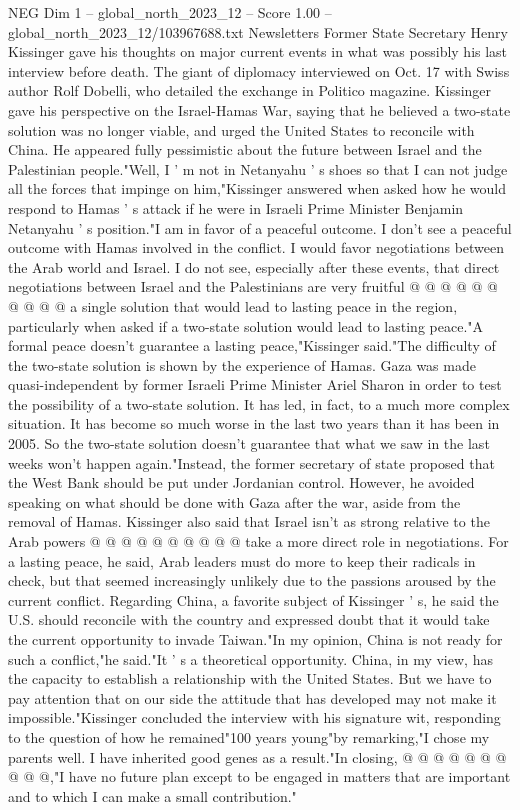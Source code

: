 \begin{textsample}{NEG Dim 1 – global\_north\_2023\_12 – Score 1.00 – global\_north\_2023\_12/103967688.txt}  \label{ex:f1_neg_364}
Newsletters Former State Secretary Henry Kissinger gave his thoughts on major current events in what was possibly his last interview before death.
The giant of diplomacy interviewed on Oct. 17 with Swiss author Rolf Dobelli, who detailed the exchange in Politico magazine.
Kissinger gave his perspective on the Israel-Hamas War, saying that he believed a two-state solution was no longer viable, and urged the United States to reconcile with China.
He appeared fully pessimistic about the future between Israel and the Palestinian people."Well, I ' m not in Netanyahu ' s shoes so that I can not judge all the forces that impinge on him,"Kissinger answered when asked how he would respond to Hamas ' s attack if he were in Israeli Prime Minister Benjamin Netanyahu ' s position."I am in favor of a peaceful outcome.
I don't see a peaceful outcome with Hamas involved in the conflict.
I would favor negotiations between the Arab world and Israel.
I do not see, especially after these events, that direct negotiations between Israel and the Palestinians are very fruitful @ @ @ @ @ @ @ @ @ @ a single solution that would lead to lasting peace in the region, particularly when asked if a two-state solution would lead to lasting peace."A formal peace doesn't guarantee a lasting peace,"Kissinger said."The difficulty of the two-state solution is shown by the experience of Hamas.
Gaza was made quasi-independent by former Israeli Prime Minister Ariel Sharon in order to test the possibility of a two-state solution.
It has led, in fact, to a much more complex situation.
It has become so much worse in the last two years than it has been in 2005.
So the two-state solution doesn't guarantee that what we saw in the last weeks won't happen again."Instead, the former secretary of state proposed that the West Bank should be put under Jordanian control.
However, he avoided speaking on what should be done with Gaza after the war, aside from the removal of Hamas.
Kissinger also said that Israel isn't as strong relative to the Arab powers @ @ @ @ @ @ @ @ @ @ take a more direct role in negotiations.
For a lasting peace, he said, Arab leaders must do more to keep their radicals in check, but that seemed increasingly unlikely due to the passions aroused by the current conflict.
Regarding China, a favorite subject of Kissinger ' s, he said the U.S. should reconcile with the country and expressed doubt that it would take the current opportunity to invade Taiwan."In my opinion, China is not ready for such a conflict,"he said."It ' s a theoretical opportunity.
China, in my view, has the capacity to establish a relationship with the United States.
But we have to pay attention that on our side the attitude that has developed may not make it impossible."Kissinger concluded the interview with his signature wit, responding to the question of how he remained"100 years young"by remarking,"I chose my parents well.
I have inherited good genes as a result."In closing, @ @ @ @ @ @ @ @ @ @,"I have no future plan except to be engaged in matters that are important and to which I can make a small contribution."

\end{textsample}
